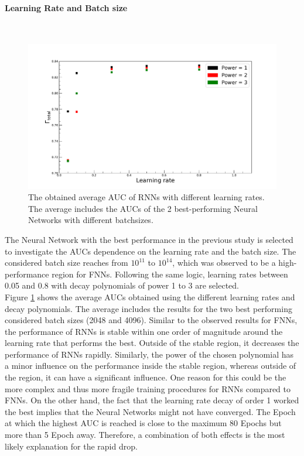 \paragraph{Learning Rate and Batch size} \mbox{} \\

\begin{figure}[H]
\centering
\includegraphics[width=\linewidth]{figs/RNN/LrAuc_Fixed}
\caption{The obtained average AUC of RNNs with different learning rates. The average includes the AUCs of the 2 best-performing Neural Networks with different batchsizes.}
\label{fig:LrRNN}
\end{figure}

The Neural Network with the best performance in the previous study is selected to investigate the AUCs dependence on the learning rate and the batch size. The considered batch size reaches from $10^{11}$ to $10^{14}$, which was observed to be a high-performance region for FNNs. Following the same logic, learning rates between 0.05 and 0.8 with decay polynomials of power 1 to 3 are selected. \\
Figure \ref{fig:LrRNN} shows the average AUCs obtained using the different learning rates and decay polynomials. The average includes the results for the two best performing considered batch sizes (2048 and 4096). Similar to the observed results for FNNs, the performance of RNNs is stable within one order of magnitude around the learning rate that performs the best. Outside of the stable region, it decreases the performance of RNNs rapidly. Similarly, the power of the chosen polynomial has a minor influence on the performance inside the stable region, whereas outside of the region, it can have a significant influence.  One reason for this could be the more complex and thus more fragile training procedures for RNNs compared to FNNs. On the other hand, the fact that the learning rate decay of order 1 worked the best implies that the Neural Networks might not have converged. The Epoch at which the highest AUC is reached is close to the maximum 80 Epochs but more than 5 Epoch away. Therefore, a combination of both effects is the most likely explanation for the rapid drop. \\

